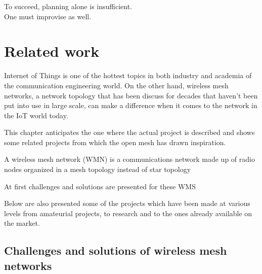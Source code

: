 
\begin{savequote}[70mm]
	To succeed, planning alone is insufficient.\\One must improvise as well.
\end{savequote}


\chapter{Related work}\label{chapter:related_work}

	Internet  of  Things  is  one  of  the  hottest  topics  in 
	both  industry  and  academia  of  the  communication  engineering 
	world.
	On  the  other  hand,  wireless  mesh  networks,  a  network 
	topology that has been discuss for decades that haven’t been put 
	into use in large scale, can make a difference when it comes to the 
	network  in  the  IoT  world  today.

	This chapter anticipates the one where the actual project is described and shows some related projects from which the open mesh has drawn inspiration.
	
	A  wireless  mesh  network  (WMN)  is  a  communications 
	network made up of radio nodes organized in a mesh topology 
	instead of star topology
	\cite{wms}
	
	At first challenges and solutions are presented for these WMS
	
	Below are also presented some of the projects which have been made at various levels from amateurial projects, to research and to the ones already available on the market.
	
	\section{Challenges and solutions of wireless mesh networks}
		
